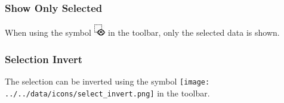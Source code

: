 %
%
%
%
%

\subsubsection{Show Only Selected}

When using the symbol \includegraphics[width=0.5cm,frame]{../../data/icons/select_show.png} in the toolbar, only the selected data is shown.

\subsubsection{Selection Invert}

The selection can be inverted using the symbol \texttt{[image: ../../data/icons/select\_invert.png]} in the toolbar.

%
%
%

